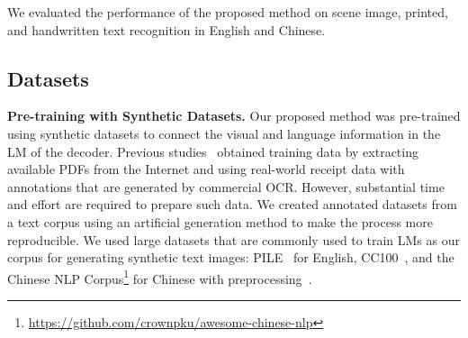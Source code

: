 \documentclass[10pt,twocolumn,letterpaper]{article}
\begin{document}
\begin{table*}[t]
\caption{
Word accuracy on CTR benchmark.
}
\label{tab:method_overall_result_chinese}
\centering
{}
\end{table*}


We evaluated the performance of the proposed method on scene image, printed, and handwritten text recognition in English and Chinese.

\subsection{Datasets}
\noindent
\textbf{Pre-training with Synthetic Datasets.}
Our proposed method was pre-trained using synthetic datasets to connect the visual and language information in the LM of the decoder. 
Previous studies~\cite{li2021trocr} obtained training data by extracting available PDFs from the Internet and using real-world receipt data with annotations that are generated by commercial OCR. 
However, substantial time and effort are required to prepare such data.
We created annotated datasets from a text corpus using an artificial generation method to make the process more reproducible. 
We used large datasets that are commonly used to train LMs as our corpus for generating synthetic text images:
PILE~\cite{gao2020pile} for English, CC100~\cite{wenzek2020ccnet}, and the Chinese NLP Corpus\footnote{\url{https://github.com/crownpku/awesome-chinese-nlp}} for Chinese with preprocessing~\cite{zhao2019uer}.
\end{document}
